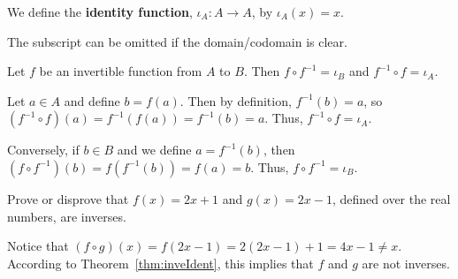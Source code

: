 \begin{df}
We define the {\bf identity function}, $\iota_A:A\to A$,
by $\iota_A(x)=x$. 

\noindent
The subscript can be omitted if the domain/codomain is clear.
\end{df}

\begin{thm}\label{thm:inveIdent}
Let $f$ be an invertible function from $A$ to $B$.  Then $f\circ f^{-1}=\iota_B$
and $f^{-1}\circ f=\iota_A$.
\begin{pf}
Let $a\in A$ and define $b=f(a)$. Then by definition, $f^{-1}(b)=a$, 
so $(f^{-1}\circ f)(a)=f^{-1}(f(a))=f^{-1}(b)=a$.
Thus, $f^{-1}\circ f=\iota_A$.

Conversely, if $b\in B$ and we define $a=f^{-1}(b)$, then 
$(f\circ f^{-1})(b)=f(f^{-1}(b))=f(a)=b$.
Thus,  $f\circ f^{-1}=\iota_B$.
\end{pf}
\end{thm}

\begin{exa}
Prove or disprove that $f(x)=2x+1$ and $g(x)=2x-1$, defined over the real numbers, are inverses.
\begin{sol}
Notice that $(f\circ g)(x)=f(2x-1)=2(2x-1)+1=4x-1\neq x$.
According to Theorem~\ref{thm:inveIdent}, this implies that $f$ and $g$ are not inverses.

\end{sol}
\end{exa}

